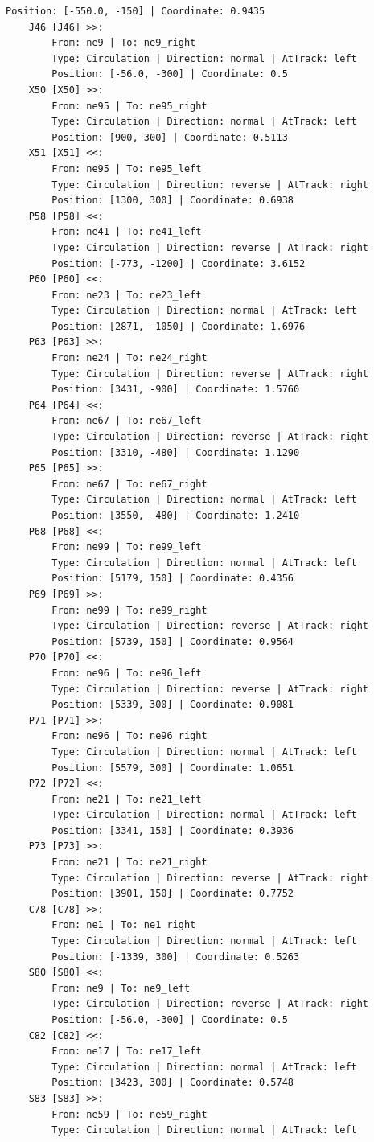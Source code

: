 \begin{lstlisting}[language = {}, tabsize=4, basicstyle=\footnotesize\ttfamily, showspaces=false, showstringspaces=false, caption = Signalling.RNA, label = {lst:EJ3_6}]
		Position: [-550.0, -150] | Coordinate: 0.9435
	J46 [J46] >>:
		From: ne9 | To: ne9_right
		Type: Circulation | Direction: normal | AtTrack: left 
		Position: [-56.0, -300] | Coordinate: 0.5
	X50 [X50] >>:
		From: ne95 | To: ne95_right
		Type: Circulation | Direction: normal | AtTrack: left 
		Position: [900, 300] | Coordinate: 0.5113
	X51 [X51] <<:
		From: ne95 | To: ne95_left
		Type: Circulation | Direction: reverse | AtTrack: right 
		Position: [1300, 300] | Coordinate: 0.6938
	P58 [P58] <<:
		From: ne41 | To: ne41_left
		Type: Circulation | Direction: reverse | AtTrack: right 
		Position: [-773, -1200] | Coordinate: 3.6152
	P60 [P60] <<:
		From: ne23 | To: ne23_left
		Type: Circulation | Direction: normal | AtTrack: left 
		Position: [2871, -1050] | Coordinate: 1.6976
	P63 [P63] >>:
		From: ne24 | To: ne24_right
		Type: Circulation | Direction: reverse | AtTrack: right 
		Position: [3431, -900] | Coordinate: 1.5760
	P64 [P64] <<:
		From: ne67 | To: ne67_left
		Type: Circulation | Direction: reverse | AtTrack: right 
		Position: [3310, -480] | Coordinate: 1.1290
	P65 [P65] >>:
		From: ne67 | To: ne67_right
		Type: Circulation | Direction: normal | AtTrack: left 
		Position: [3550, -480] | Coordinate: 1.2410
	P68 [P68] <<:
		From: ne99 | To: ne99_left
		Type: Circulation | Direction: normal | AtTrack: left 
		Position: [5179, 150] | Coordinate: 0.4356
	P69 [P69] >>:
		From: ne99 | To: ne99_right
		Type: Circulation | Direction: reverse | AtTrack: right 
		Position: [5739, 150] | Coordinate: 0.9564
	P70 [P70] <<:
		From: ne96 | To: ne96_left
		Type: Circulation | Direction: reverse | AtTrack: right 
		Position: [5339, 300] | Coordinate: 0.9081
	P71 [P71] >>:
		From: ne96 | To: ne96_right
		Type: Circulation | Direction: normal | AtTrack: left 
		Position: [5579, 300] | Coordinate: 1.0651
	P72 [P72] <<:
		From: ne21 | To: ne21_left
		Type: Circulation | Direction: normal | AtTrack: left 
		Position: [3341, 150] | Coordinate: 0.3936
	P73 [P73] >>:
		From: ne21 | To: ne21_right
		Type: Circulation | Direction: reverse | AtTrack: right 
		Position: [3901, 150] | Coordinate: 0.7752
	C78 [C78] >>:
		From: ne1 | To: ne1_right
		Type: Circulation | Direction: normal | AtTrack: left 
		Position: [-1339, 300] | Coordinate: 0.5263
	S80 [S80] <<:
		From: ne9 | To: ne9_left
		Type: Circulation | Direction: reverse | AtTrack: right 
		Position: [-56.0, -300] | Coordinate: 0.5
	C82 [C82] <<:
		From: ne17 | To: ne17_left
		Type: Circulation | Direction: normal | AtTrack: left 
		Position: [3423, 300] | Coordinate: 0.5748
	S83 [S83] >>:
		From: ne59 | To: ne59_right
		Type: Circulation | Direction: normal | AtTrack: left 

\end{lstlisting}
